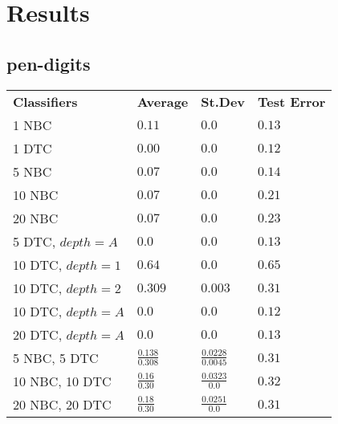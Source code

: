 \documentclass[12pt]{article}
\begin{document}
\maketitle
\pagebreak
\tableofcontents
\pagebreak
\section{Results}
	\subsection{pen-digits}
		\begin{tabular}{llll}
			\textbf{Classifiers} & \textbf{Average} & \textbf{St.Dev} & \textbf{Test Error}\\
			1 NBC & $0.11$ & $0.0$ & $0.13$\\
			1 DTC & $0.00$ & $0.0$ & $0.12$\\
			5 NBC & $0.07$ & $0.0$ & $0.14$\\
			10 NBC & $0.07$ & $0.0$ & $0.21$\\
			20 NBC & $0.07$ & $0.0$ & $0.23$\\
			5 DTC, $depth = A$ & $0.0$ & $0.0$ & $0.13$ \\
			10 DTC, $depth = 1$ & $0.64$ & $0.0$ & $0.65$ \\
			10 DTC, $depth = 2$ & $0.309$ & $0.003$ & $0.31$ \\
			10 DTC, $depth = A$ & $0.0$ & $0.0$ & $0.12$ \\
			20 DTC, $depth = A$ & $0.0$ & $0.0$ & $0.13$ \\
			5 NBC, 5 DTC & $\frac{0.138}{0.308}$ & $\frac{0.0228}{0.0045}$ & $0.31$ \\
			10 NBC, 10 DTC & $\frac{0.16}{0.30}$ & $\frac{0.0323}{0.0}$ & $0.32$ \\
			20 NBC, 20 DTC & $\frac{0.18}{0.30}$ & $\frac{0.0251}{0.0}$ & $0.31$ \\
		\end{tabular}
		
\end{document}
